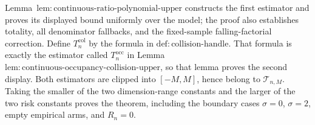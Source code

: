 Lemma~\(\mathrm{lem:continuous\text{-}ratio\text{-}polynomial\text{-}upper}\) constructs the first estimator and proves its displayed bound uniformly over the model; the proof also establishes totality, all denominator fallbacks, and the fixed-sample falling-factorial correction.  Define \(T_n^{\mathrm{col}}\) by the formula in \(\mathrm{def:collision\text{-}handle}\).  That formula is exactly the estimator called \(T_n^{\mathrm{occ}}\) in Lemma~\(\mathrm{lem:continuous\text{-}occupancy\text{-}collision\text{-}upper}\), so that lemma proves the second display.  Both estimators are clipped into \([-M,M]\), hence belong to \(\mathcal T_{n,M}\).  Taking the smaller of the two dimension-range constants and the larger of the two risk constants proves the theorem, including the boundary cases \(\sigma=0\), \(\sigma=2\), empty empirical arms, and \(R_n=0\).